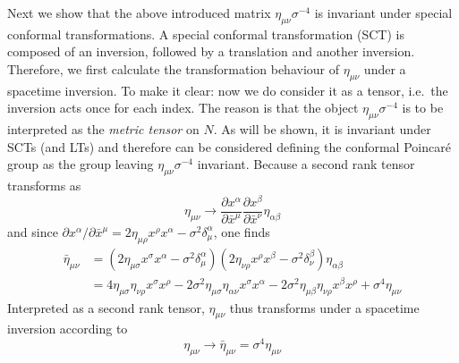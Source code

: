 \documentclass[10pt]{article}
\newcommand{\pd}{\partial}
\begin{document}
Next we show that the above introduced matrix $\eta_{\mu\nu} 
\sigma^{-4}$ is invariant under special conformal 
transformations. A special conformal transformation (SCT) is 
composed of an inversion, followed by a translation and another 
inversion. Therefore, we first calculate the transformation 
behaviour of $\eta_{\mu\nu}$ under a spacetime inversion. To make 
it clear: now we do consider it as a tensor, i.e.\ the inversion 
acts once for each index. The reason is that the object 
$\eta_{\mu\nu}\sigma^{-4}$ is to be interpreted as the 
\emph{metric tensor} on $N$. As will be shown, it is invariant 
under SCTs (and LTs) and therefore can be considered defining the 
conformal Poincar\'e group as the group leaving
$\eta_{\mu\nu}\sigma^{-4}$ invariant. Because a second rank 
tensor transforms as
%
\begin{displaymath}
	\eta_{\mu\nu} \rightarrow \frac{\pd x^\alpha}{\pd\bar{x}^\mu} 
	\frac{\pd x^\beta}{\pd\bar{x}^\nu} \eta_{\alpha\beta}
\end{displaymath}
and since $\pd x^\alpha/\pd \bar{x}^\mu = 2\eta_{\mu\rho} x^\rho 
x^\alpha - \sigma^2 \delta^\alpha_\mu$, one finds
%
\begin{align*}
	\bar{\eta}_{\mu\nu} &= (2\eta_{\mu\sigma} x^\sigma x^\alpha - 
	\sigma^2 \delta^\alpha_\mu) (2\eta_{\nu\rho} x^\rho x^\beta - 
	\sigma^2 \delta^\beta_\nu) \eta_{\alpha\beta} \\
	&= 4\eta_{\mu\sigma} \eta_{\nu\rho} x^\sigma x^\rho - 2 
	\sigma^2 \eta_{\mu\sigma} \eta_{\alpha\nu} x^\sigma x^\alpha - 
	2 \sigma^2 \eta_{\mu\beta} \eta_{\nu\rho} x^\beta x^\rho + 
	\sigma^4 \eta_{\mu\nu}
\end{align*}
Interpreted as a second rank tensor, $\eta_{\mu\nu}$ thus 
transforms under a spacetime inversion according to
%
\begin{equation}
	\eta_{\mu\nu} \rightarrow \bar{\eta}_{\mu\nu} = \sigma^4 
	\eta_{\mu\nu}
\end{equation}
\end{document}
